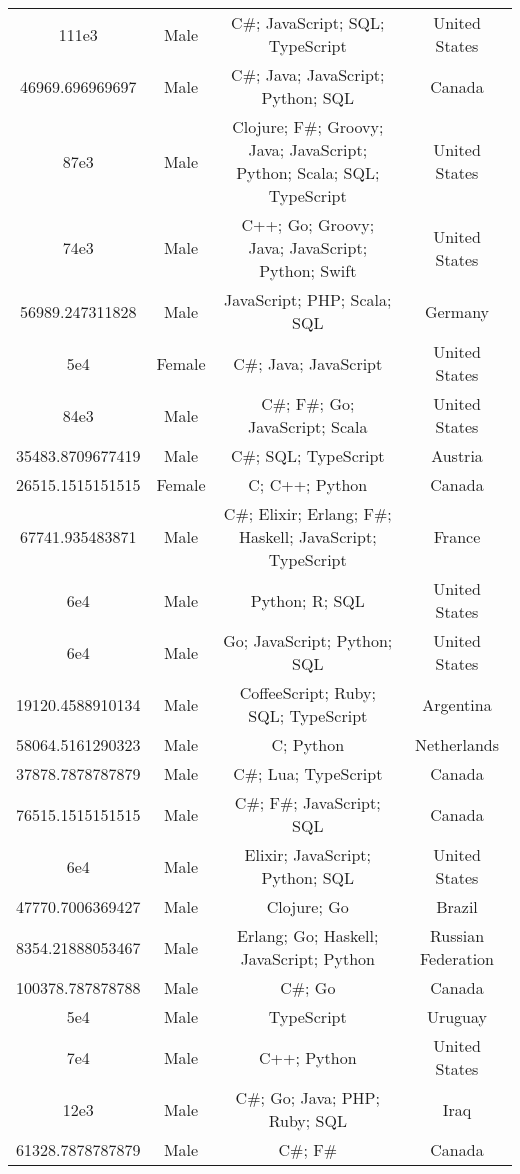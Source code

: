 \begin{center}
\begin{tabular}{ |c|c|c|c| }
111e3  &  Male  &  C\#; JavaScript; SQL; TypeScript  &  United States  \\ 
46969.696969697  &  Male  &  C\#; Java; JavaScript; Python; SQL  &  Canada  \\ 
87e3  &  Male  &  Clojure; F\#; Groovy; Java; JavaScript; Python; Scala; SQL; TypeScript  &  United States  \\ 
74e3  &  Male  &  C++; Go; Groovy; Java; JavaScript; Python; Swift  &  United States  \\ 
56989.247311828  &  Male  &  JavaScript; PHP; Scala; SQL  &  Germany  \\ 
5e4  &  Female  &  C\#; Java; JavaScript  &  United States  \\ 
84e3  &  Male  &  C\#; F\#; Go; JavaScript; Scala  &  United States  \\ 
35483.8709677419  &  Male  &  C\#; SQL; TypeScript  &  Austria  \\ 
26515.1515151515  &  Female  &  C; C++; Python  &  Canada  \\ 
67741.935483871  &  Male  &  C\#; Elixir; Erlang; F\#; Haskell; JavaScript; TypeScript  &  France  \\ 
6e4  &  Male  &  Python; R; SQL  &  United States  \\ 
6e4  &  Male  &  Go; JavaScript; Python; SQL  &  United States  \\ 
19120.4588910134  &  Male  &  CoffeeScript; Ruby; SQL; TypeScript  &  Argentina  \\ 
58064.5161290323  &  Male  &  C; Python  &  Netherlands  \\ 
37878.7878787879  &  Male  &  C\#; Lua; TypeScript  &  Canada  \\ 
76515.1515151515  &  Male  &  C\#; F\#; JavaScript; SQL  &  Canada  \\ 
6e4  &  Male  &  Elixir; JavaScript; Python; SQL  &  United States  \\ 
47770.7006369427  &  Male  &  Clojure; Go  &  Brazil  \\ 
8354.21888053467  &  Male  &  Erlang; Go; Haskell; JavaScript; Python  &  Russian Federation  \\ 
100378.787878788  &  Male  &  C\#; Go  &  Canada  \\ 
5e4  &  Male  &  TypeScript  &  Uruguay  \\ 
7e4  &  Male  &  C++; Python  &  United States  \\ 
12e3  &  Male  &  C\#; Go; Java; PHP; Ruby; SQL  &  Iraq  \\ 
61328.7878787879  &  Male  &  C\#; F\#  &  Canada  \\ 

\end{tabular}
\end{center}
